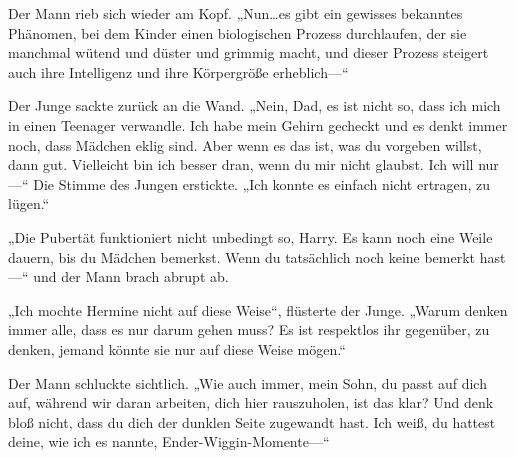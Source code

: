 Der Mann rieb sich wieder am Kopf.
„Nun…es gibt ein gewisses bekanntes Phänomen, bei dem Kinder einen biologischen Prozess durchlaufen, der sie manchmal wütend und düster und grimmig macht, und dieser Prozess steigert auch ihre Intelligenz und ihre Körpergröße erheblich—“

Der Junge sackte zurück an die Wand.
„Nein, Dad, es ist nicht so, dass ich mich in einen Teenager verwandle. Ich habe mein Gehirn gecheckt und es denkt immer noch, dass Mädchen eklig sind. Aber wenn es das ist, was du vorgeben willst, dann gut. Vielleicht bin ich besser dran, wenn du mir nicht glaubst. Ich will nur—“
Die Stimme des Jungen erstickte.
„Ich konnte es einfach nicht ertragen, zu lügen.“

„Die Pubertät funktioniert nicht unbedingt so, Harry. Es kann noch eine Weile dauern, bis du Mädchen bemerkst. Wenn du tatsächlich noch keine bemerkt hast—“ und der Mann brach abrupt ab.

„Ich mochte Hermine nicht auf diese Weise“, flüsterte der Junge.
„Warum denken immer alle, dass es nur darum gehen muss? Es ist respektlos ihr gegenüber, zu denken, jemand könnte sie nur auf diese Weise mögen.“

Der Mann schluckte sichtlich.
„Wie auch immer, mein Sohn, du passt auf dich auf, während wir daran arbeiten, dich hier rauszuholen, ist das klar? Und denk bloß nicht, dass du dich der dunklen Seite zugewandt hast. Ich weiß, du hattest deine, wie ich es nannte, Ender-Wiggin-Momente—“

